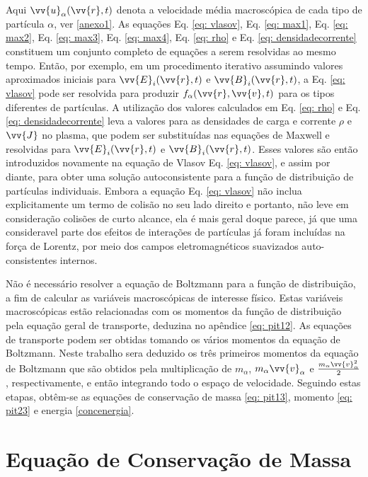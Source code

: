 \documentclass[12pt,oneside,a4paper]{abntex2}
\begin{document}
Aqui $ \vv{u}_\alpha(\vv{r},t)$ denota a velocidade média macroscópica de cada tipo de partícula $\alpha$, ver \ref{anexo1}. As equações Eq. \ref{eq: vlasov}, Eq. \ref{eq: max1}, Eq. \ref{eq: max2}, Eq. \ref{eq: max3}, Eq. \ref{eq: max4}, Eq. \ref{eq: rho} e Eq. \ref{eq: densidadecorrente} constituem um conjunto completo de equações a serem resolvidas ao mesmo tempo. Então, por exemplo, em um procedimento iterativo assumindo valores aproximados iniciais para $\vv{E}_i(\vv{r}, t)$ e $\vv{B}_i(\vv{r}, t)$, a Eq. \ref{eq: vlasov} pode ser resolvida para produzir $f_\alpha(\vv{r},\vv{v},t)$ para os tipos diferentes de partículas. A utilização dos valores calculados em Eq. \ref{eq: rho} e Eq. \ref{eq: densidadecorrente} leva a valores para as densidades de carga e corrente $\rho$ e  $\vv{J}$ no plasma, que podem ser substituídas nas equações de Maxwell e resolvidas para $\vv{E}_i(\vv{r}, t)$ e $\vv{B}_i(\vv{r}, t)$. Esses valores são então introduzidos novamente na equação de Vlasov Eq. \ref{eq: vlasov}, e assim por diante, para obter uma solução autoconsistente para a função de distribuição de partículas individuais. Embora a equação Eq. \ref{eq: vlasov} não inclua explicitamente um termo de colisão no seu lado direito e portanto, não leve em consideração colisões de curto alcance, ela é mais geral doque parece, já que uma consideravel parte dos efeitos de interações de partículas já foram incluídas na força de Lorentz, por meio dos campos eletromagnéticos suavizados auto-consistentes internos. 

Não é necessário resolver a equação de Boltzmann para a função de distribuição, a fim de calcular as variáveis macroscópicas de interesse físico. Estas variáveis macroscópicas estão relacionadas com os momentos da função de distribuição pela equação geral de transporte, deduzina no apêndice \ref{eq: pit12}. As equações de transporte podem ser obtidas tomando os vários momentos da equação de Boltzmann. Neste trabalho sera deduzido os três primeiros momentos da equação de Boltzmann que são obtidos pela multiplicação de $m_\alpha$, $m_\alpha \vv{v}_\alpha$ e $\frac{m_\alpha \vv{v}^2_\alpha}{2}$, respectivamente, e então integrando todo o espaço de velocidade. Seguindo estas etapas, obtêm-se as equações de conservação de massa \ref{eq: pit13}, momento \ref{eq: pit23} e energia \ref{concenergia}.

\section{Equação de Conservação de Massa}
\end{document}
